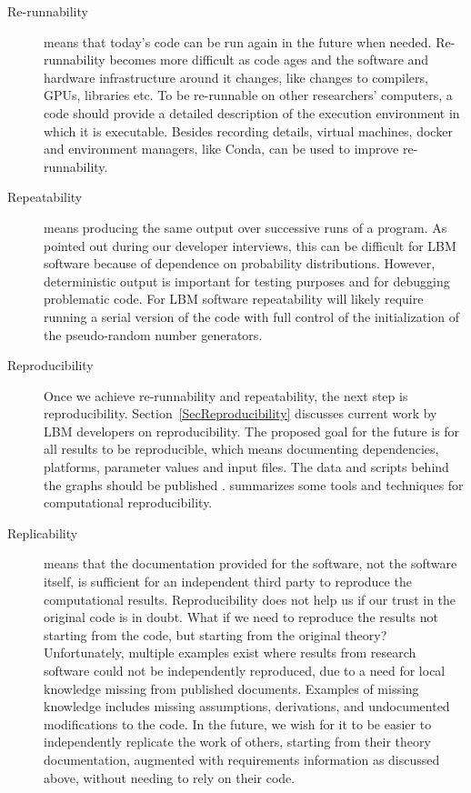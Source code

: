 \documentclass[final, 3p, times, authoryear]{elsarticle}
\begin{document}
\begin{description}

	\item[Re-runnability] means that today's code can be run again in the future
	when needed.  Re-runnability becomes more difficult as code ages and the
	software and hardware infrastructure around it changes, like changes to
	compilers, GPUs, libraries etc.  To be re-runnable on other researchers'
	computers, a code should provide a detailed description of the execution
	environment in which it is executable.  Besides recording details, virtual
	machines, docker and environment managers, like Conda, can be used to
	improve re-runnability.

	\item[Repeatability] means producing the same output over successive runs of
	a program.  As pointed out during our developer interviews, this can be
	difficult for LBM software because of dependence on probability
	distributions.  However, deterministic output is important for testing
	purposes and for debugging problematic code.  For LBM software repeatability
	will likely require running a serial version of the code with full control
	of the initialization of the pseudo-random number generators.

	\item[Reproducibility] Once we achieve re-runnability and repeatability, the
	next step is reproducibility.  Section~\ref{SecReproducibility} discusses
	current work by LBM developers on reproducibility.  The proposed goal for
	the future is for all results to be reproducible, which means documenting
	dependencies, platforms, parameter values and input files. The data and
	scripts behind the graphs should be published
	\citep{BenureauAndRougier2017}.  \citet{PiccoloAndFrampton2016} summarizes
	some tools and techniques for computational reproducibility.

	\item[Replicability] means that the documentation provided for the software,
	not the software itself, is sufficient for an independent third party to
	reproduce the computational results.  Reproducibility does not help us if
	our trust in the original code is in doubt.  What if we need to reproduce
	the results not starting from the code, but starting from the original
	theory? Unfortunately, multiple examples exist \citep{CrickAndHall2014,
	IonescuAndJansson2013} where results from research software could not be
	independently reproduced, due to a need for local knowledge missing from
	published documents.  Examples of missing knowledge includes missing
	assumptions, derivations, and undocumented modifications to the code.  In
	the future, we wish for it to be easier to independently replicate the work
	of others, starting from their theory documentation, augmented with
	requirements information as discussed above, without needing to rely on
	their code.

\end{description}
\end{document}
